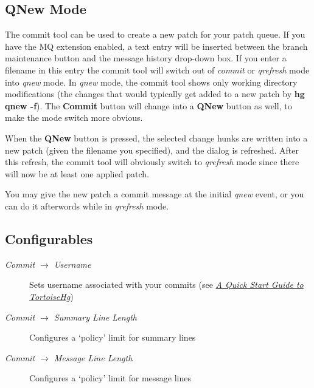 \documentclass[letterpaper,10pt,english]{manual}
\begin{document}
\subsection{QNew Mode}

The commit tool can be used to create a new patch for your patch queue.
If you have the MQ extension enabled, a text entry will be inserted
between the branch maintenance button and the message history drop-down
box.  If you enter a filename in this entry the commit tool will switch
out of \emph{commit} or \emph{qrefresh} mode into \emph{qnew} mode.  In \emph{qnew} mode,
the commit tool shows only working directory modifications (the changes
that would typically get added to a new patch by \textbf{hg qnew -f}).
The \textbf{Commit} button will change into a \textbf{QNew} button
as well, to make the mode switch more obvious.

When the \textbf{QNew} button is pressed, the selected change hunks
are written into a new patch (given the filename you specified), and the
dialog is refreshed.  After this refresh, the commit tool will obviously
switch to \emph{qrefresh} mode since there will now be at least one applied
patch.

You may give the new patch a commit message at the initial \emph{qnew} event,
or you can do it afterwords while in \emph{qrefresh} mode.


\subsection{Configurables}
\begin{description}
\item[\emph{Commit \(\rightarrow\) Username}]
Sets username associated with your commits (see \hyperlink{--doc-quick}{\emph{A Quick Start Guide to TortoiseHg}})

\item[\emph{Commit \(\rightarrow\) Summary Line Length}]
Configures a `policy' limit for summary lines

\item[\emph{Commit \(\rightarrow\) Message Line Length}]
Configures a `policy' limit for message lines

\end{description}
\end{document}
